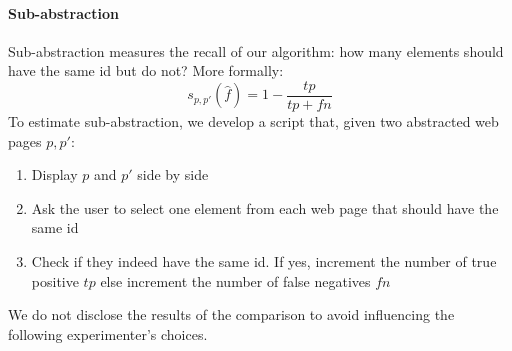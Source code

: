 \paragraph{Sub-abstraction}
 Sub-abstraction measures the recall of our algorithm: how many elements should have the same id but do not?
 More formally:
 \begin{equation}
s_{p, p'}(\hat{f}) = 1 - \frac{tp}{tp + fn}
\end{equation}
 To estimate sub-abstraction, we develop a script that, given two abstracted web pages $p, p'$:
\begin{enumerate}
\item Display $p$ and $p'$ side by side
\item Ask the user to select one element from each web page that should have the same id
\item Check if they indeed have the same id. If yes, increment the number of true positive $tp$ else increment the number of false negatives $fn$
\end{enumerate}

We do not disclose the results of the comparison to avoid influencing the following experimenter's choices.



